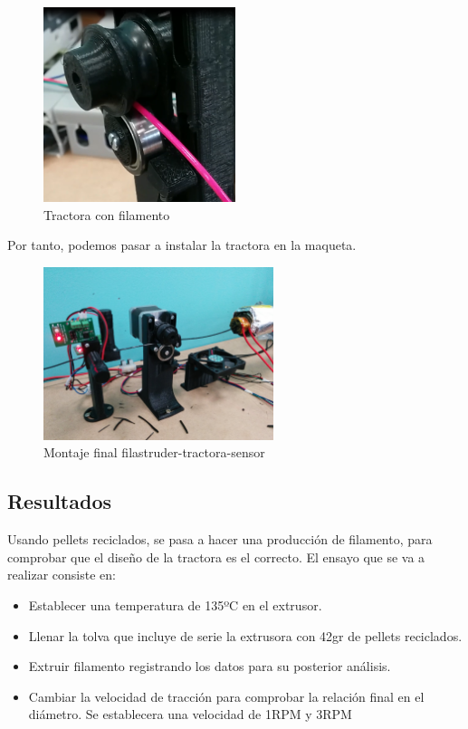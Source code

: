 	\begin{figure}[H]
            \centering
            \includegraphics[width=0.5\textwidth]{images/producciones/tractora/final.png}
            \caption{Tractora con filamento}
            \label{fig:tractora_fila}
    \end{figure}


Por tanto, podemos pasar a instalar la tractora en la maqueta.

\begin{figure}[H]
    \centering
    \includegraphics[width=0.6\textwidth]{images/producciones/tractora/IMG_20150709_130326.jpg}
    \caption{Montaje final filastruder-tractora-sensor}
    \label{fig:montaje_final}
\end{figure}

\subsection{Resultados}

Usando pellets reciclados, se pasa a hacer una producción de filamento, para comprobar que el diseño de la tractora es el correcto. El ensayo que se va a realizar consiste en:

\begin{itemize}
    \item{Establecer una temperatura de 135ºC en el extrusor.}
    \item{Llenar la tolva que incluye de serie la extrusora con 42gr de pellets reciclados.}
    \item{Extruir filamento registrando los datos para su posterior análisis.}
    \item{Cambiar la velocidad de tracción para comprobar la relación final en el diámetro. Se establecera una velocidad de 1RPM y 3RPM}
\end{itemize}

